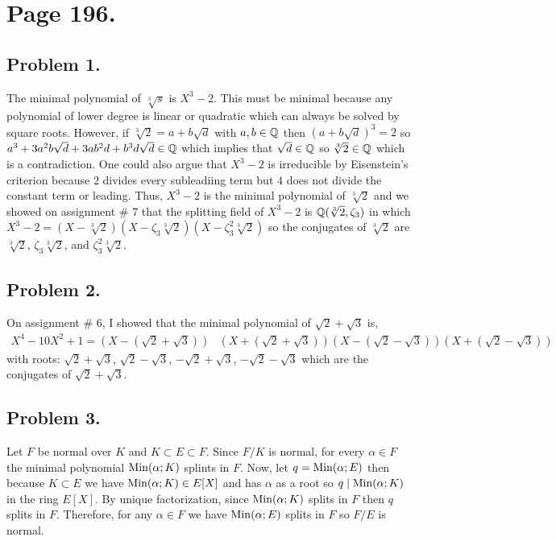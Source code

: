 \documentclass[12pt]{extarticle}
\begin{document}

\section*{Page 196.} 
\subsection*{Problem 1.}
The minimal polynomial of $\sqrt[3]{s}$ is $X^3 - 2$. This must be minimal because any polynomial of lower degree is linear or quadratic which can always be solved by square roots. However, if $\sqrt[3]{2} = a + b \sqrt{d}$ with $a, b \in \mathbb{Q}$ then $(a + b \sqrt{d})^3 = 2$ so $a^3 + 3 a^2 b \sqrt{d} + 3 ab^2 d + b^3 d \sqrt{d} \in \mathbb{Q}$ which implies that $\sqrt{d} \in \mathbb{Q}$ so $\sqrt[3]{2} \in \mathbb{Q}$ which is a contradiction. One could also argue that $X^3 - 2$ is irreducible by Eisenstein's criterion because $2$ divides every subleadiing term but $4$ does not divide the constant term or leading. Thus, $X^3 - 2$ is the minimal polynomial of $\sqrt[3]{2}$ and we showed on assignment \# 7 that the splitting field of $X^3 - 2$ is $\mathbb{Q}(\sqrt[3]{2}, \zeta_3)$ in which $X^3 - 2 = (X - \sqrt[3]{2})(X - \zeta_3 \sqrt[3]{2})(X - \zeta_3^2 \sqrt[3]{2})$ so the conjugates of $\sqrt[3]{2}$ are $\sqrt[3]{2}$, $\zeta_3 \sqrt[3]{2}$, and $\zeta_3^2 \sqrt[3]{2}$.   

\subsection*{Problem 2.}
On assignment \# 6, I showed that the minimal polynomial of $\sqrt{2} + \sqrt{3}$ is,
\begin{align*}
X^4 - 10 X^2 + 1 = (X - (\sqrt{2} + \sqrt{3})) & (X + (\sqrt{2} + \sqrt{3}))(X - (\sqrt{2} - \sqrt{3}))(X + (\sqrt{2} - \sqrt{3})) 
\end{align*}
with roots: $\sqrt{2} + \sqrt{3}$, $\sqrt{2} - \sqrt{3}$, $-\sqrt{2} + \sqrt{3}$, $-\sqrt{2} - \sqrt{3}$ which are the conjugates of $\sqrt{2} + \sqrt{3}$. 

\subsection*{Problem 3.}
Let $F$ be normal over $K$ and $K \subset E \subset F$. Since $F/K$ is normal, for every $\alpha \in F$ the minimal polynomial $\mathrm{Min}(\alpha;K)$ splints in $F$. Now, let $q = \mathrm{Min}(\alpha;E)$ then because $K \subset E$ we have $\mathrm{Min}(\alpha;K) \in E[X]$ and has $\alpha$ as a root so $q \mid \mathrm{Min}(\alpha;K)$ in the ring $E[X]$. By unique factorization, since $\mathrm{Min}(\alpha;K)$ splits in $F$ then $q$ splits in $F$. Therefore, for any $\alpha \in F$ we have $\mathrm{Min}(\alpha;E)$ splits in $F$ so $F/E$ is normal. 
\end{document}
